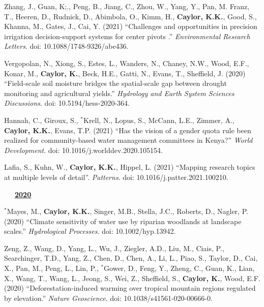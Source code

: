 \documentclass[10pt]{report}
\begin{document}
\begin{etaremune}


\item Zhang, J., Guan, K;., Peng, B., Jiang, C., Zhou, W., Yang, Y., Pan, M. Franz, T., Heeren, D., Rudnick, D., Abimbola, O., Kimm, H., \textbf{Caylor, K.K.}, Good, S., Khanna, M., Gates, J., Cai, Y. (2021) ``Challenges and opportunities in precision irrigation decision-support systems for center pivots .'' {\em Environmental Research Letters}. doi: 10.1088/1748-9326/abe436.

\item Vergopolan, N., Xiong, S., Estes, L., Wanders, N., Chaney, N.W., Wood, E.F., Konar, M., \textbf{Caylor, K.}, Beck, H.E., Gatti, N., Evans, T.,  Sheffield, J. (2020) ``Field-scale soil moisture bridges the spatial-scale gap between drought monitoring and agricultural yields.'' {\em Hydrology and Earth System Sciences Discussions}. doi: 10.5194/hess-2020-364.

\item Hannah, C., Giroux, S., $^{*}$Krell, N., Lopus, S., McCann, L.E., Zimmer, A., \textbf{Caylor, K.K.}, Evans, T.P. (2021) ``Has the vision of a gender quota rule been realized for community-based water management committees in Kenya?'' {\em World Development}. doi: 10.1016/j.worlddev.2020.105154.

\item Lafia, S., Kuhn, W., \textbf{Caylor, K.K.}, Hippel, L. (2021) ``Mapping research topics at multiple levels of detail''. {\em Patterns}. doi: 10.1016/j.patter.2021.100210.

\mbox{\ \ \ \underline{\textbf{2020}}}

\item $^{*}$Mayes, M., \textbf{Caylor, K.K.}, Singer, M.B., Stella, J.C., Roberts, D., Nagler, P. (2020) ``Climate sensitivity of water use by riparian woodlands at landscape scales.'' {\em Hydrological Processes}. doi: 10.1002/hyp.13942.

\item Zeng, Z., Wang, D., Yang, L.,  Wu, J.,  Ziegler, A.D., Liu, M., Ciais, P., Searchinger, T.D., Yang, Z., Chen, D., Chen, A., Li, L., Piao, S., Taylor, D., Cai, X., Pan, M., Peng, L., Lin, P., $^{*}$Gower, D., Feng, Y.,  Zheng, C., Guan, K., Lian, X., Wang, T., Wang, L., Jeong, S., Wei, Z., Sheffield, S., \textbf{Caylor, K.}, Wood, E.F. (2020) ``Deforestation-induced warming over tropical mountain regions regulated by elevation.'' {\em Nature Geoscience}. doi: 10.1038/s41561-020-00666-0.
 

\end{etaremune}
\end{document}
